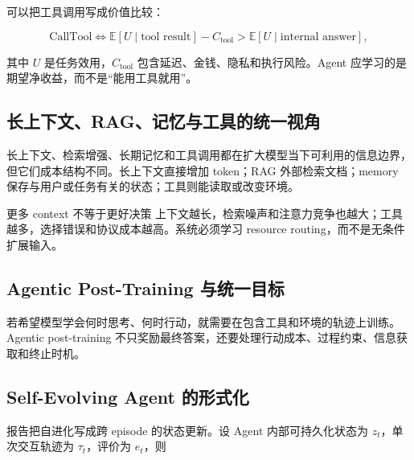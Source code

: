可以把工具调用写成价值比较：

$$
\mathrm{CallTool}\iff
\mathbb{E}[U\mid \text{tool result}]-C_{\text{tool}}
>\mathbb{E}[U\mid \text{internal answer}],
$$

其中 $U$ 是任务效用，$C_{\text{tool}}$ 包含延迟、金钱、隐私和执行风险。Agent 应学习的是期望净收益，而不是“能用工具就用”。

\subsection{长上下文、RAG、记忆与工具的统一视角}

长上下文、检索增强、长期记忆和工具调用都在扩大模型当下可利用的信息边界，但它们成本结构不同。长上下文直接增加 token；RAG 外部检索文档；memory 保存与用户或任务有关的状态；工具则能读取或改变环境。



\begin{warningbox}{更多 context 不等于更好决策}
上下文越长，检索噪声和注意力竞争也越大；工具越多，选择错误和协议成本越高。系统必须学习 resource routing，而不是无条件扩展输入。
\end{warningbox}

\subsection{Agentic Post-Training 与统一目标}

若希望模型学会何时思考、何时行动，就需要在包含工具和环境的轨迹上训练。Agentic post-training 不只奖励最终答案，还要处理行动成本、过程约束、信息获取和终止时机。



\subsection{Self-Evolving Agent 的形式化}

报告把自进化写成跨 episode 的状态更新。设 Agent 内部可持久化状态为 $z_t$，单次交互轨迹为 $\tau_t$，评价为 $e_t$，则

